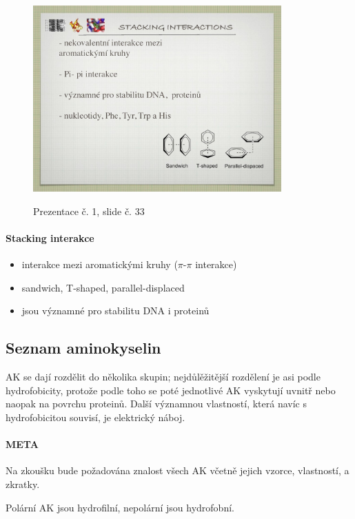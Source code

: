 \documentclass[DIV=8]{scrreprt}
\newcommand{\mybox}[2]{
    \paragraph{#1} #2
}
\begin{document}
\begin{figure}
    \caption{Prezentace č. 1, slide č. 33}
    \includegraphics[width=0.85\textwidth]{slides-1/slide-33.jpg}
    \centering
    \label{slides-1-slide-33}
\end{figure}

\paragraph{Stacking interakce}
\begin{itemize}[nosep]
    \item interakce mezi aromatickými kruhy (\(\pi\)-\(\pi\) interakce)
    \item sandwich, T-shaped, parallel-displaced
    \item jsou významné pro stabilitu DNA i proteinů
\end{itemize}



\subsection{Seznam aminokyselin} \label{Seznam aminokyselin}


AK se dají rozdělit do několika skupin; nejdůlěžitější rozdělení je asi podle hydrofobicity, protože podle toho se poté jednotlivé AK vyskytují uvnitř nebo naopak na povrchu proteinů. Další významnou vlastností, která navíc s hydrofobicitou souvisí, je elektrický náboj.

\mybox{META}{Na zkoušku bude požadována znalost všech AK včetně jejich vzorce, vlastností, a zkratky.}


Polární AK jsou hydrofilní, nepolární jsou hydrofobní.
\end{document}
